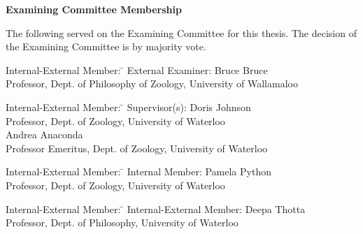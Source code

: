 \cleardoublepage %

 
\begin{center}\textbf{Examining Committee Membership}\end{center}
  \noindent
The following served on the Examining Committee for this thesis. The decision of the Examining Committee is by majority vote.
  \bigskip
  
  \noindent
\begin{tabbing}
Internal-External Member: \=  \kill %
External Examiner: \>  Bruce Bruce \\ 
\> Professor, Dept. of Philosophy of Zoology, University of Wallamaloo \\
\end{tabbing} 
  \bigskip
  
  \noindent
\begin{tabbing}
Internal-External Member: \=  \kill %
Supervisor(s): \> Doris Johnson \\
\> Professor, Dept. of Zoology, University of Waterloo \\
\> Andrea Anaconda \\
\> Professor Emeritus, Dept. of Zoology, University of Waterloo \\
\end{tabbing}
  \bigskip
  
  \noindent
  \begin{tabbing}
Internal-External Member: \=  \kill %
Internal Member: \> Pamela Python \\
\> Professor, Dept. of Zoology, University of Waterloo \\
\end{tabbing}
  \bigskip
  
  \noindent
\begin{tabbing}
Internal-External Member: \=  \kill %
Internal-External Member: \> Deepa Thotta \\
\> Professor, Dept. of Philosophy, University of Waterloo \\
\end{tabbing}
  \bigskip
  
